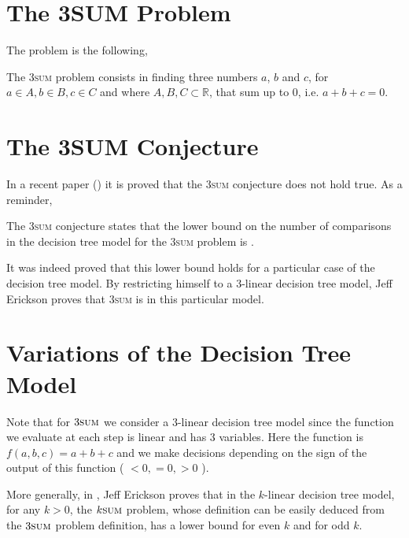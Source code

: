 

\section{The 3SUM Problem}

The problem is the following,

\begin{problem}
The 3\textsc{sum} problem consists in finding three numbers $a$, $b$ and $c$, for
$a \in A, b \in B, c \in C$ and where $A, B, C \subset \mathbb{R}$, that sum
up to $0$, i.e. $a + b + c = 0$.
\end{problem}


\section{The 3SUM Conjecture}

In a recent paper (\cite{DBLP:journals/corr/JorgensenP14}) it is proved that
the 3\textsc{sum} conjecture does not hold true. As a reminder,

\begin{conjecture}
The 3\textsc{sum} conjecture states that the lower bound on the number of
comparisons in the decision tree model for the 3\textsc{sum} problem
is .
\end{conjecture}

It was indeed proved that this lower bound holds for a particular case of the
decision tree model. By restricting himself to a $3$-linear decision tree model,
Jeff Erickson proves that 3\textsc{sum} is  in this particular
model.


\section{Variations of the Decision Tree Model}

Note that for $3\textsc{sum}$ we consider a $3$-linear decision tree model
since the function we evaluate at each step is linear and has 3 variables.
Here the function is $f( a, b, c ) = a + b + c$ and we make decisions depending on
the sign of the output of this function ( $<0, =0, >0$ ).

More generally, in \cite{cj99-08}, Jeff Erickson proves that in the $k$-linear
decision tree model, for any $k > 0$, the $k\textsc{sum}$ problem,
whose definition can be easily deduced from the $3\textsc{sum}$ problem
definition, has a  lower bound for even $k$ and
 for odd $k$.


